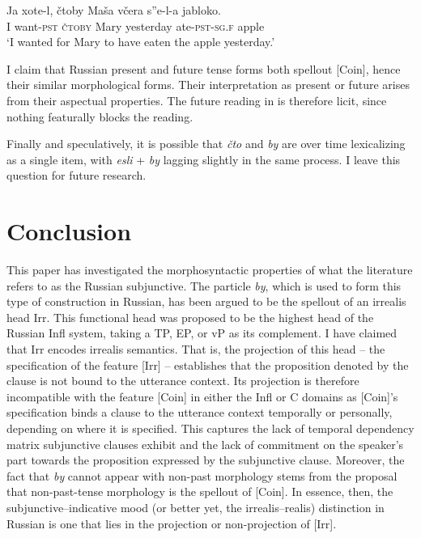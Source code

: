 \documentclass[output=paper,
modfonts,
newtxmath,
hidelinks,
]{langscibook}
\begin{document}
\ea \label{10:ex34}
\gll Ja xote-l, čtoby Maša včera s”e-l-a jabloko.\\
     I want\textsc{-pst} \textsc{čtoby} Mary yesterday ate\textsc{-pst-sg.f} apple \\
\glt `I wanted for Mary to have eaten the apple yesterday.’
\z

\noindent I claim that Russian present and future tense forms both spellout [Coin], hence their similar morphological forms. Their interpretation as present or future arises from their aspectual properties. The future reading in  is therefore licit, since nothing featurally blocks the reading.

Finally and speculatively, it is possible that \textit{čto} and \textit{by} are over time lexicalizing as a single item, with \textit{esli} + \textit{by} lagging slightly in the same process. I leave this question for future research.

\section{Conclusion}\label{10:s6}

This paper has investigated the morphosyntactic properties of what the literature refers to as the Russian subjunctive. The particle \textit{by}, which is used to form this type of construction in Russian, has been argued to be the spellout of an irrealis head Irr. This functional head was proposed to be the highest head of the Russian Infl system, taking a TP, EP, or vP as its complement. I have claimed that Irr encodes irrealis semantics. That is, the projection of this head -- the specification of the feature [Irr] -- establishes that the proposition denoted by the clause is not bound to the utterance context. Its projection is therefore incompatible with the feature [Coin] in either the Infl or C domains as [Coin]’s specification binds a clause to the utterance context temporally or personally, depending on where it is specified. This captures the lack of temporal dependency matrix subjunctive clauses exhibit and the lack of commitment on the speaker’s part towards the proposition expressed by the subjunctive clause. Moreover, the fact that \textit{by} cannot appear with non-past morphology stems from the proposal that non-past-tense morphology is the spellout of [Coin]. In essence, then, the subjunctive--indicative mood (or better yet, the irrealis--realis) distinction in Russian is one that lies in the projection or non-projection of [Irr].
\end{document}
